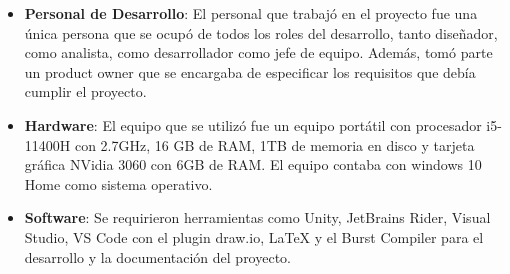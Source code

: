 \begin{itemize}
    \item \textbf{Personal de Desarrollo}: El personal que trabajó en el proyecto fue una única persona que se ocupó de todos los roles del desarrollo, tanto diseñador, como analista, como desarrollador como jefe de equipo. Además, tomó parte un product owner que se encargaba de especificar los requisitos que debía cumplir el proyecto.
    
    \item \textbf{Hardware}: El equipo que se utilizó fue un equipo portátil con procesador i5-11400H con 2.7GHz, 16 GB de RAM, 1TB de memoria en disco y tarjeta gráfica NVidia 3060 con 6GB de RAM. El equipo contaba con windows 10 Home como sistema operativo. 
    
    \item \textbf{Software}: Se requirieron herramientas como Unity, JetBrains Rider, Visual Studio, VS Code con el plugin draw.io, LaTeX y el Burst Compiler para el desarrollo y la documentación del proyecto.
\end{itemize}

